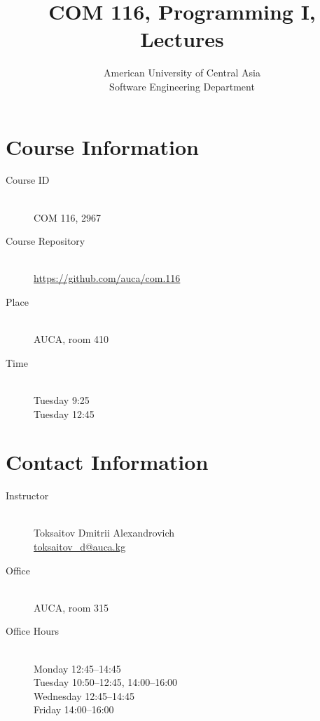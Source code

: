 \documentclass[12pt,a4paper,oneside]{article}
\begin{document}
    \title{COM 116, Programming I, Lectures}
    \author{
        American University of Central Asia\\
        Software Engineering Department
    }
    \date{}
    \maketitle

    \section{Course Information}

        \begin{description}
            \item[Course ID]\hfill\\
                COM 116, 2967
            \item[Course Repository]\hfill\\
                \url{https://github.com/auca/com.116}
            \item[Place]\hfill\\
                AUCA, room 410
            \item[Time]\hfill\\
                Tuesday 9:25\\
                Tuesday 12:45
        \end{description}

    \section{Contact Information}

        \begin{description}
            \item[Instructor]\hfill\\
                Toksaitov Dmitrii Alexandrovich\\
                \href{mailto:toksaitov_d@auca.kg}{toksaitov\_d@auca.kg}
            \item[Office]\hfill\\
                AUCA, room 315
            \item[Office Hours]\hfill\\
                Monday 12:45--14:45\\
                Tuesday 10:50--12:45, 14:00--16:00\\
                Wednesday 12:45--14:45\\
                Friday 14:00--16:00
        \end{description}
\end{document}
